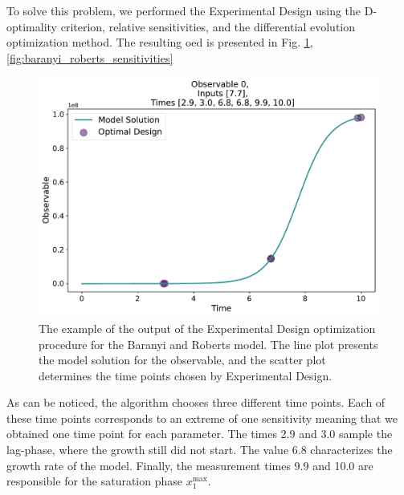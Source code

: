 \documentclass[10pt,A4paper]{article}
\begin{document}
To solve this problem, we performed the Experimental Design using the D-optimality criterion, relative sensitivities, and the differential evolution optimization method.
The resulting \ac{oed} is presented in Fig. \ref{fig:baranyi_roberts_observable},\ref{fig:baranyi_roberts_sensitivities}
\begin{figure}[H]
    \centering
    \includegraphics[scale=0.4]{Figures/Observable_Results_baranyi_roberts_ode_fisher_determinant_rel_sensit_cont_6times_1temps_000_x_00.pdf}
    \caption{{\footnotesize The example of the output of the Experimental Design optimization procedure for the Baranyi and Roberts model. 
    The line plot presents the model solution for the observable, and the scatter plot determines the time points chosen by Experimental Design.}}
    \label{fig:baranyi_roberts_observable}
\end{figure}
As can be noticed, the algorithm chooses three different time points.
Each of these time points corresponds to an extreme of one sensitivity meaning that we obtained one time point for each parameter.
The times 2.9 and 3.0 sample the lag-phase, where the growth still did not start.
The value 6.8 characterizes the growth rate of the model.
Finally, the measurement times 9.9 and 10.0 are responsible for the saturation phase $x_1^\text{max}$.
\end{document}
